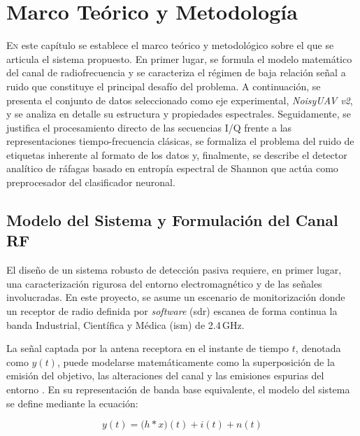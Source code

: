 \chapter{Marco Teórico y Metodología}
\label{cap:MarcoTeorico}


\lettrine[lraise=-0.1, lines=2, loversize=0.2]{E}{n} este capítulo se establece el marco teórico y metodológico sobre el que se articula el sistema propuesto. En primer lugar, se formula el modelo matemático del canal de radiofrecuencia y se caracteriza el régimen de baja relación señal a ruido que constituye el principal desafío del problema. A continuación, se presenta el conjunto de datos seleccionado como eje experimental, \textit{NoisyUAV v2}, y se analiza en detalle su estructura y propiedades espectrales. Seguidamente, se justifica el procesamiento directo de las secuencias I/Q frente a las representaciones tiempo-frecuencia clásicas, se formaliza el problema del ruido de etiquetas inherente al formato de los datos y, finalmente, se describe el detector analítico de ráfagas basado en entropía espectral de Shannon que actúa como preprocesador del clasificador neuronal.

\section{Modelo del Sistema y Formulación del Canal RF}
El diseño de un sistema robusto de detección pasiva requiere, en primer lugar, una caracterización rigurosa del entorno electromagnético y de las señales involucradas. En este proyecto, se asume un escenario de monitorización donde un receptor de radio definida por \textit{software} (\gls{sdr}) escanea de forma continua la banda Industrial, Científica y Médica (\gls{ism}) de 2.4\,GHz.

La señal captada por la antena receptora en el instante de tiempo $t$, denotada como $y(t)$, puede modelarse matemáticamente como la superposición de la emisión del objetivo, las alteraciones del canal y las emisiones espurias del entorno \cite{rout_novel_2025, ezuma_detection_2020}. En su representación de banda base equivalente, el modelo del sistema se define mediante la ecuación:

\begin{equation}
    y(t) = \big(h * x\big)(t) + i(t) + n(t)
    \label{eq:modelo_sistema}
\end{equation}

